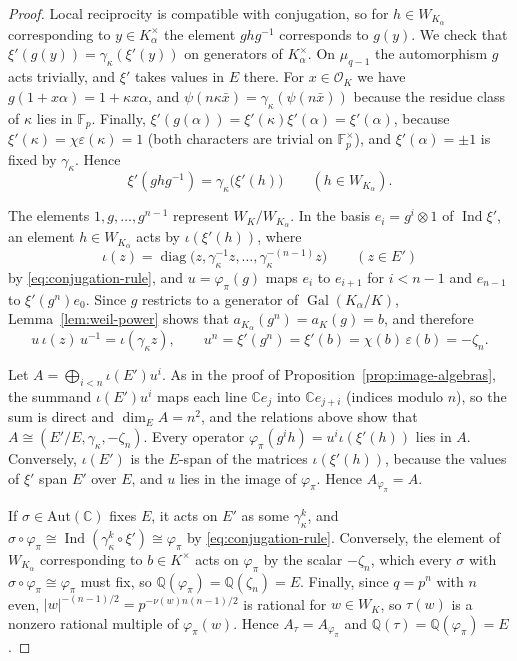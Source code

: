\documentclass[a4paper,11pt]{amsart}
\theoremstyle{definition}
\theoremstyle{remark}
\numberwithin{equation}{section}
\newcommand{\Q}{\mathbb{Q}}
\DeclareMathOperator{\Gal}{Gal}
\DeclareMathOperator{\diag}{diag}
\newcommand{\F}{\mathbb{F}}
\newcommand{\C}{\mathbb{C}}
\DeclareMathOperator{\Ind}{Ind}
\begin{document}
\begin{proof}
Local reciprocity is compatible with conjugation, so for $h\in W_{K_\alpha}$ corresponding to $y\in K_\alpha^\times$ the element $ghg^{-1}$ corresponds to $g(y)$. We check that $\xi'(g(y))=\gamma_\kappa(\xi'(y))$ on generators of $K_\alpha^\times$. On $\mu_{q-1}$ the automorphism $g$ acts trivially, and $\xi'$ takes values in $E$ there. For $x\in\mathcal O_K$ we have $g(1+x\alpha)=1+\kappa x\alpha$, and $\psi(n\kappa\bar x)=\gamma_\kappa(\psi(n\bar x))$ because the residue class of $\kappa$ lies in $\F_p$. Finally, $\xi'(g(\alpha))=\xi'(\kappa)\xi'(\alpha)=\xi'(\alpha)$, because $\xi'(\kappa)=\chi\varepsilon(\kappa)=1$ (both characters are trivial on $\F_p^\times$), and $\xi'(\alpha)=\pm1$ is fixed by $\gamma_\kappa$. Hence
\begin{equation}\label{eq:conjugation-rule}
 \xi'(ghg^{-1})=\gamma_\kappa\bigl(\xi'(h)\bigr)\qquad(h\in W_{K_\alpha}).
\end{equation}

The elements $1,g,\dots,g^{n-1}$ represent $W_K/W_{K_\alpha}$. In the basis $e_i=g^i\otimes1$ of $\Ind\xi'$, an element $h\in W_{K_\alpha}$ acts by $\iota(\xi'(h))$, where
\[
 \iota(z)=\diag\bigl(z,\gamma_\kappa^{-1}z,\dots,\gamma_\kappa^{-(n-1)}z\bigr)\qquad (z\in E')
\]
by \eqref{eq:conjugation-rule}, and $u=\varphi_\pi(g)$ maps $e_i$ to $e_{i+1}$ for $i<n-1$ and $e_{n-1}$ to $\xi'(g^n)e_0$. Since $g$ restricts to a generator of $\Gal(K_\alpha/K)$, Lemma~\ref{lem:weil-power} shows that $a_{K_\alpha}(g^n)=a_K(g)=b$, and therefore
\[
 u\,\iota(z)\,u^{-1}=\iota(\gamma_\kappa z),\qquad u^n=\xi'(g^n)=\xi'(b)=\chi(b)\,\varepsilon(b)=-\zeta_n.
\]

Let $A=\bigoplus_{i<n}\iota(E')u^i$. As in the proof of Proposition~\ref{prop:image-algebras}, the summand $\iota(E')u^i$ maps each line $\C e_j$ into $\C e_{j+i}$ (indices modulo $n$), so the sum is direct and $\dim_E A=n^2$, and the relations above show that $A\cong(E'/E,\gamma_\kappa,-\zeta_n)$. Every operator $\varphi_\pi(g^ih)=u^i\iota(\xi'(h))$ lies in $A$. Conversely, $\iota(E')$ is the $E$-span of the matrices $\iota(\xi'(h))$, because the values of $\xi'$ span $E'$ over $E$, and $u$ lies in the image of $\varphi_\pi$. Hence $A_{\varphi_\pi}=A$.

If $\sigma\in\mathrm{Aut}(\C)$ fixes $E$, it acts on $E'$ as some $\gamma_\kappa^k$, and $\sigma\circ\varphi_\pi\cong\Ind(\gamma_\kappa^k\circ\xi')\cong\varphi_\pi$ by \eqref{eq:conjugation-rule}. Conversely, the element of $W_{K_\alpha}$ corresponding to $b\in K^\times$ acts on $\varphi_\pi$ by the scalar $-\zeta_n$, which every $\sigma$ with $\sigma\circ\varphi_\pi\cong\varphi_\pi$ must fix, so $\Q(\varphi_\pi)=\Q(\zeta_n)=E$. Finally, since $q=p^n$ with $n$ even, $|w|^{-(n-1)/2}=p^{-\nu(w)n(n-1)/2}$ is rational for $w\in W_K$, so $\tau(w)$ is a nonzero rational multiple of $\varphi_\pi(w)$. Hence $A_\tau=A_{\varphi_\pi}$ and $\Q(\tau)=\Q(\varphi_\pi)=E$.
\end{proof}
\end{document}
